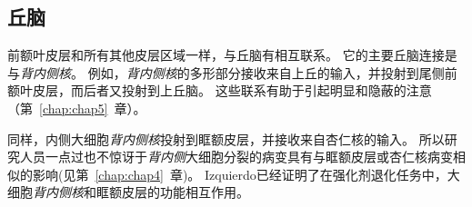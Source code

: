 \subsection{丘脑}
\par

前额叶皮层和所有其他皮层区域一样，与丘脑有相互联系。
它的主要丘脑连接是与\textit{背内侧核}。
例如，\textit{背内侧核}的多形部分接收来自上丘的输入\cite{russchen1987afferent,erickson2004subcortical}，并投射到尾侧前额叶皮层，而后者又投射到上丘脑\cite{fries1984cortical}。
这些联系有助于引起明显和隐蔽的注意（第~\ref{chap:chap5}~章）。
\par


同样，内侧大细胞\textit{背内侧核}投射到眶额皮层\cite{ray1993organization}，并接收来自杏仁核的输入\cite{russchen1987afferent}。
所以研究人员一点过也不惊讶于\textit{背内侧}大细胞分裂的病变具有与眶额皮层或杏仁核病变相似的影响\cite{mitchell2007neurotoxic}(见第~\ref{chap:chap4}~章)。
Izquierdo\cite{izquierdo2010functional}已经证明了在强化剂退化任务中，大细胞\textit{背内侧核}和眶额皮层的功能相互作用。


